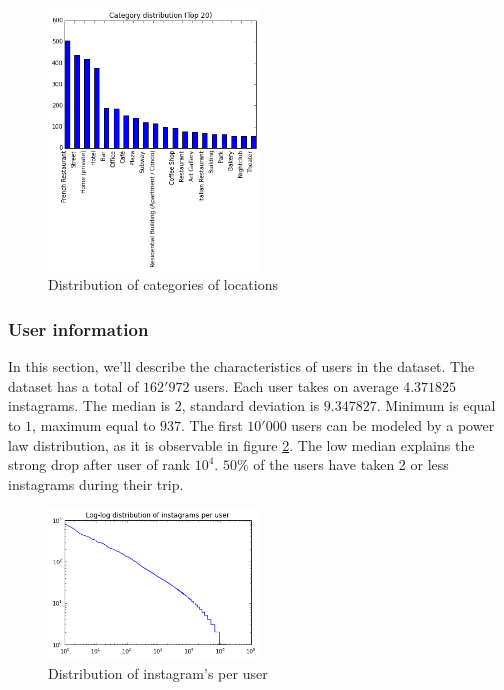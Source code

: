 \begin{figure}[h!]
  \centering
    \includegraphics[width=0.5\textwidth]{images/category_distribution}
  \caption{Distribution of categories of locations}
  \label{fig:category_distribution}
\end{figure}

\subsubsection{User information}

In this section, we'll describe the characteristics of users in the dataset. The dataset has a total of $162'972$ users. Each user takes on average $4.371825$ instagrams. The median is $2$, standard deviation is $9.347827$. Minimum is equal to $1$, maximum equal to $937$. The first $10'000$ users can be modeled by a power law distribution, as it is observable in figure \ref{fig:user_instagram}. The low median explains the strong drop after user of rank $10^4$. $50\%$ of the users have taken 2 or less instagrams during their trip. 

\begin{figure}[h!]
  \centering
    \includegraphics[width=0.5\textwidth]{images/user_instagram_log_log}
  \caption{Distribution of instagram's per user}
  \label{fig:user_instagram}
\end{figure}

